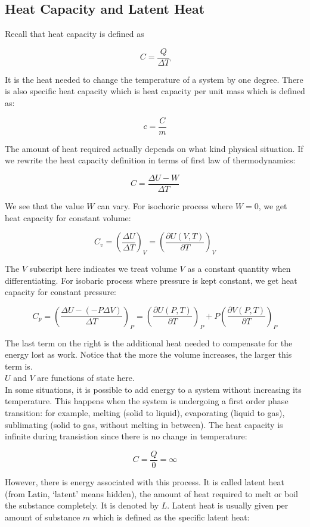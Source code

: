 \subsection{Heat Capacity and Latent Heat}

Recall that heat capacity is defined as

\[C=\frac{Q}{\Delta T}\]

It is the heat needed to change the temperature of a system by one degree. There is also specific heat capacity which is heat capacity per unit mass which is defined as:

\[c=\frac{C}{m}\]

The amount of heat required actually depends on what kind physical situation. If we rewrite the heat capacity definition in terms of first law of thermodynamics:

\[C=\frac{\Delta U - W}{\Delta T}\]

We see that the value $W$ can vary. For isochoric process where $W=0$, we get heat capacity for constant volume:

\[C_v=\left( \frac{\Delta U}{\Delta T} \right)_V=\left( \frac{\partial U(V,T)}{\partial T} \right)_V\]

The $V$ subscript here indicates we treat volume $V$ as a constant quantity when differentiating. For isobaric process where pressure is kept constant, we get heat capacity for constant pressure:

\[C_p=\left( \frac{\Delta U - (-P\Delta V)}{\Delta T} \right)_P=\left( \frac{\partial U(P,T)}{\partial T} \right)_P+P\left( \frac{\partial V(P,T)}{\partial T} \right)_P\]

The last term on the right is the additional heat needed to compensate for the energy lost as work. Notice that the more the volume increases, the larger this term is. \\

$U$ and $V$ are functions of state here. \\

In some situations, it is possible to add energy to a system without increasing its temperature. This happens when the system is undergoing a first order phase transition: for example, melting (solid to liquid), evaporating (liquid to gas), sublimating (solid to gas, without melting in between). The heat capacity is infinite during transistion since there is no change in temperature:

\[C=\frac{Q}{0}=\infty\]

However, there is energy associated with this process. It is called latent heat (from Latin, `latent' means hidden), the amount of heat required to melt or boil the substance completely. It is denoted by $L$. Latent heat is usually given per amount of substance $m$ which is defined as the specific latent heat:

